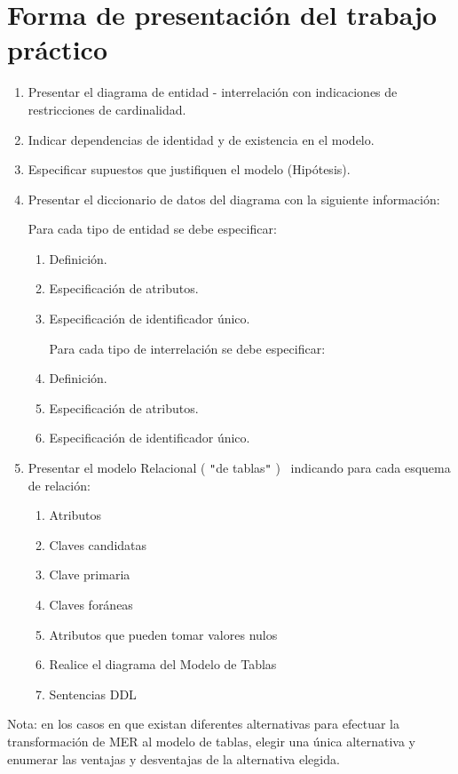 \documentclass[a4paper,11pt]{article}
\begin{document}
\clearpage

\section{\textbf{Forma de presentación del trabajo práctico}}

\begin{enumerate}
\item Presentar el diagrama de entidad - interrelación con indicaciones de restricciones 
de cardinalidad. 

\item Indicar dependencias de identidad y de existencia en el modelo. 

\item Especificar supuestos que justifiquen el modelo (Hipótesis). 

\item Presentar el diccionario de datos del diagrama con la siguiente información: 

Para cada tipo de entidad se debe especificar:

\begin{enumerate}
\item Definición. 

\item Especificación de atributos. 

\item Especificación de identificador único. 

Para cada tipo de interrelación se debe especificar: ~ 

\item Definición. 

\item Especificación de atributos. 

\item Especificación de identificador único. 
\end{enumerate}

\item Presentar el modelo Relacional ( \texttt{"}de tablas\texttt{"} )~ indicando 
para cada esquema de relación: 

\begin{enumerate}
\item Atributos 

\item Claves candidatas

\item Clave primaria

\item Claves foráneas 

\item Atributos que pueden tomar valores nulos

\item Realice el diagrama del Modelo de Tablas

\item Sentencias DDL
\end{enumerate}
\end{enumerate}

Nota: en los casos en que existan diferentes alternativas para efectuar la transformación 
de MER al modelo de tablas, elegir una única alternativa y enumerar las ventajas 
y desventajas de la alternativa elegida. \pagebreak{}\label{HToc293405800}
\end{document}
